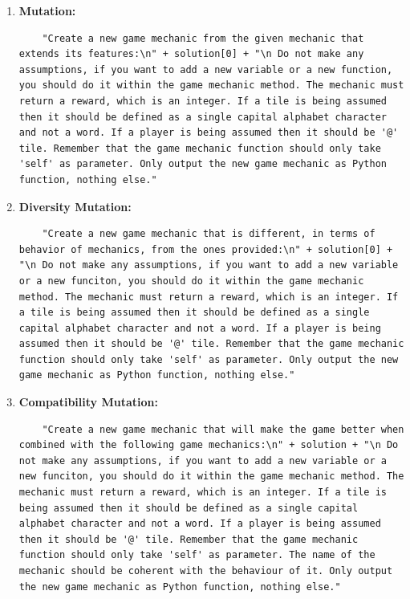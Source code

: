 \documentclass{article} %
\begin{document}
\begin{enumerate}
    

\item \textbf{Mutation:}


\begin{lstlisting}
    "Create a new game mechanic from the given mechanic that extends its features:\n" + solution[0] + "\n Do not make any assumptions, if you want to add a new variable or a new function, you should do it within the game mechanic method. The mechanic must return a reward, which is an integer. If a tile is being assumed then it should be defined as a single capital alphabet character and not a word. If a player is being assumed then it should be '@' tile. Remember that the game mechanic function should only take 'self' as parameter. Only output the new game mechanic as Python function, nothing else."
\end{lstlisting}

\item \textbf{Diversity Mutation:}

\begin{lstlisting}
    "Create a new game mechanic that is different, in terms of behavior of mechanics, from the ones provided:\n" + solution[0] + "\n Do not make any assumptions, if you want to add a new variable or a new funciton, you should do it within the game mechanic method. The mechanic must return a reward, which is an integer. If a tile is being assumed then it should be defined as a single capital alphabet character and not a word. If a player is being assumed then it should be '@' tile. Remember that the game mechanic function should only take 'self' as parameter. Only output the new game mechanic as Python function, nothing else."
\end{lstlisting}

\item \textbf{Compatibility Mutation:}

\begin{lstlisting}
    "Create a new game mechanic that will make the game better when combined with the following game mechanics:\n" + solution + "\n Do not make any assumptions, if you want to add a new variable or a new funciton, you should do it within the game mechanic method. The mechanic must return a reward, which is an integer. If a tile is being assumed then it should be defined as a single capital alphabet character and not a word. If a player is being assumed then it should be '@' tile. Remember that the game mechanic function should only take 'self' as parameter. The name of the mechanic should be coherent with the behaviour of it. Only output the new game mechanic as Python function, nothing else."
    

\end{lstlisting}
\end{enumerate}
\end{document}
